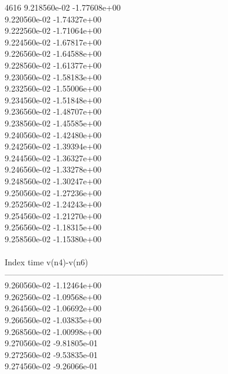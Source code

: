 4616	9.218560e-02	-1.77608e+00	\\ 	9.220560e-02	-1.74327e+00	\\ 	9.222560e-02	-1.71064e+00	\\ 	9.224560e-02	-1.67817e+00	\\ 	9.226560e-02	-1.64588e+00	\\ 	9.228560e-02	-1.61377e+00	\\ 	9.230560e-02	-1.58183e+00	\\ 	9.232560e-02	-1.55006e+00	\\ 	9.234560e-02	-1.51848e+00	\\ 	9.236560e-02	-1.48707e+00	\\ 	9.238560e-02	-1.45585e+00	\\ 	9.240560e-02	-1.42480e+00	\\ 	9.242560e-02	-1.39394e+00	\\ 	9.244560e-02	-1.36327e+00	\\ 	9.246560e-02	-1.33278e+00	\\ 	9.248560e-02	-1.30247e+00	\\ 	9.250560e-02	-1.27236e+00	\\ 	9.252560e-02	-1.24243e+00	\\ 	9.254560e-02	-1.21270e+00	\\ 	9.256560e-02	-1.18315e+00	\\ 	9.258560e-02	-1.15380e+00	\\ \hline
\\ \hline
Index   time            v(n4)-v(n6)     \\ \hline
--------------------------------------------------------------------------------\\ 	9.260560e-02	-1.12464e+00	\\ 	9.262560e-02	-1.09568e+00	\\ 	9.264560e-02	-1.06692e+00	\\ 	9.266560e-02	-1.03835e+00	\\ 	9.268560e-02	-1.00998e+00	\\ 	9.270560e-02	-9.81805e-01	\\ 	9.272560e-02	-9.53835e-01	\\ 	9.274560e-02	-9.26066e-01	\\ \hline
